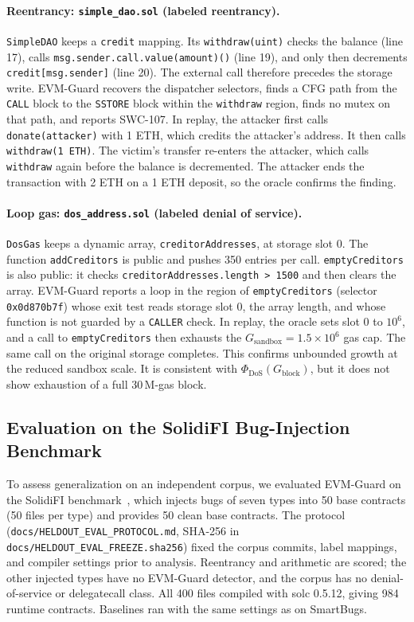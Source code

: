 \documentclass[pdflatex,sn-mathphys]{sn-jnl}
\theoremstyle{thmstyleone}
\theoremstyle{thmstyletwo}
\begin{document}
\paragraph{Reentrancy: \texttt{simple\_dao.sol} (labeled reentrancy).} \texttt{SimpleDAO} keeps a \texttt{credit} mapping. Its \texttt{withdraw(uint)} checks the balance (line 17), calls \texttt{msg.sender.call.value(amount)()} (line 19), and only then decrements \texttt{credit[msg.sender]} (line 20). The external call therefore precedes the storage write. EVM-Guard recovers the dispatcher selectors, finds a CFG path from the \texttt{CALL} block to the \texttt{SSTORE} block within the \texttt{withdraw} region, finds no mutex on that path, and reports SWC-107. In replay, the attacker first calls \texttt{donate(attacker)} with 1 ETH, which credits the attacker's address. It then calls \texttt{withdraw(1 ETH)}. The victim's transfer re-enters the attacker, which calls \texttt{withdraw} again before the balance is decremented. The attacker ends the transaction with 2 ETH on a 1 ETH deposit, so the oracle confirms the finding.

\paragraph{Loop gas: \texttt{dos\_address.sol} (labeled denial of service).} \texttt{DosGas} keeps a dynamic array, \texttt{creditorAddresses}, at storage slot 0. The function \texttt{addCreditors} is public and pushes 350 entries per call. \texttt{emptyCreditors} is also public: it checks \texttt{creditorAddresses.length > 1500} and then clears the array. EVM-Guard reports a loop in the region of \texttt{emptyCreditors} (selector \texttt{0x0d870b7f}) whose exit test reads storage slot 0, the array length, and whose function is not guarded by a \texttt{CALLER} check. In replay, the oracle sets slot 0 to $10^6$, and a call to \texttt{emptyCreditors} then exhausts the $G_{\mathrm{sandbox}} = 1.5\times10^6$ gas cap. The same call on the original storage completes. This confirms unbounded growth at the reduced sandbox scale. It is consistent with $\Phi_{\mathrm{DoS}}(G_{\mathrm{block}})$, but it does not show exhaustion of a full 30\,M-gas block.

\subsection{Evaluation on the SolidiFI Bug-Injection Benchmark}\label{sec:results:heldout}
To assess generalization on an independent corpus, we evaluated EVM-Guard on the SolidiFI benchmark~\cite{ghaleb2020how}, which injects bugs of seven types into 50 base contracts (50 files per type) and provides 50 clean base contracts. The protocol (\texttt{docs/HELDOUT\_EVAL\_PROTOCOL.md}, SHA-256 in \texttt{docs/HELDOUT\_EVAL\_FREEZE.sha256}) fixed the corpus commits, label mappings, and compiler settings prior to analysis. Reentrancy and arithmetic are scored; the other injected types have no EVM-Guard detector, and the corpus has no denial-of-service or delegatecall class. All 400 files compiled with solc 0.5.12, giving 984 runtime contracts. Baselines ran with the same settings as on SmartBugs.
\end{document}
